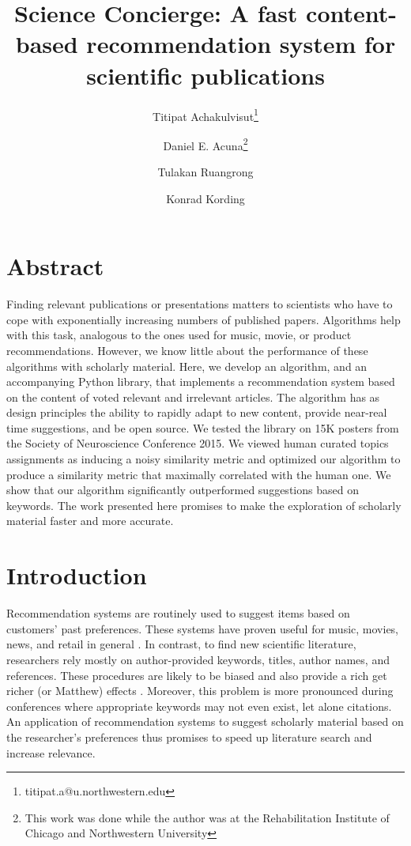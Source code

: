 \documentclass[a4paper]{article}
\title{Science Concierge: A fast content-based recommendation system for scientific publications}
\author[1]{Titipat Achakulvisut\thanks{titipat.a@u.northwestern.edu}}
\author[3]{Daniel E. Acuna\thanks{This work was done while the author was at the Rehabilitation Institute of Chicago and Northwestern University}}
\author[4]{Tulakan Ruangrong}
\author[1,2]{Konrad Kording}
\affil[1]{Department of Biomedical Engineering, Northwestern University}
\affil[2]{Sensory Motor Performance Program, Rehabilitation Institute of Chicago}
\affil[3]{School of Information Studies, Syracuse University}
\affil[4]{Department of Biomedical Engineering, Mahidol University}
\begin{document}
\maketitle

\section{Abstract}

Finding relevant publications or presentations matters to scientists who have to cope with exponentially increasing numbers of published papers. Algorithms help with this task, analogous to the ones used for music, movie, or product recommendations. However, we know little about the performance of these algorithms with scholarly material. Here, we develop an algorithm, and an accompanying Python library, that implements a recommendation system based on the content of voted relevant and irrelevant articles. The algorithm has as design principles the ability to rapidly adapt to new content, provide near-real time suggestions, and be open source. We tested the library on 15K posters from the Society of Neuroscience Conference 2015. We viewed human curated topics assignments as inducing a noisy similarity metric and optimized our algorithm to produce a similarity metric that maximally correlated with the human one. We show that our algorithm significantly outperformed suggestions based on keywords.  The work presented here promises to make the exploration of scholarly material faster and more accurate.

\section{Introduction}

Recommendation systems are routinely used to suggest items based on customers’ past preferences. These systems have proven useful for music, movies, news, and retail in general \cite{manning2008introduction}. In contrast, to find new scientific literature, researchers rely mostly on author-provided keywords, titles, author names, and references. These procedures are likely to be biased \cite{chavalarias2010science} and also provide a rich get richer (or Matthew) effects \cite{petersen2011quantitative}. Moreover, this problem is more pronounced during conferences where appropriate keywords may not even exist, let alone citations. An application of recommendation systems to suggest scholarly material based on the researcher’s preferences thus promises to speed up literature search and increase relevance.
\end{document}

